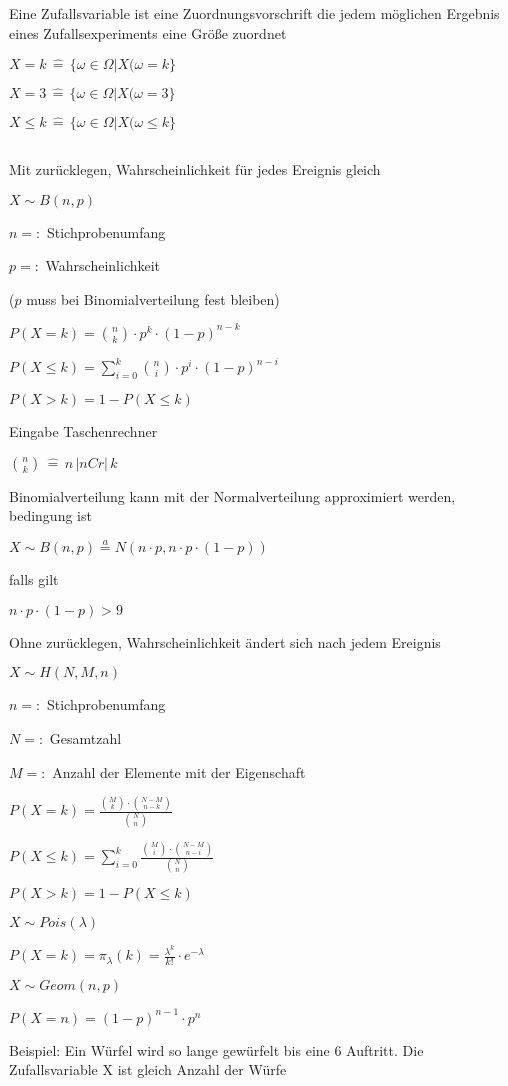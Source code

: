 \documentclass[10pt,a4paper,landscape]{article}
\begin{document}
\begin{multicols*}{4}
\subsection{}
\parbox{\columnwidth}{\centering Eine Zufallsvariable ist eine Zuordnungsvorschrift die jedem  möglichen Ergebnis eines Zufallsexperiments eine Größe zuordnet}
\parbox{\columnwidth}{\centering $X = k \, \widehat{=} \, \{ \omega \in \Omega \vert X( \omega = k \}$}
\parbox{\columnwidth}{\centering $X = 3 \, \widehat{=} \, \{ \omega \in \Omega \vert X( \omega = 3 \}$}
\parbox{\columnwidth}{\centering $X \leq k \, \widehat{=} \, \{ \omega \in \Omega \vert X( \omega \leq k \}$}
\subsection{}
\parbox{\columnwidth}{\centering Mit zurücklegen, Wahrscheinlichkeit für jedes Ereignis gleich }
\parbox{\columnwidth}{\centering $X \sim B(n,p)$}
\parbox{\columnwidth}{\centering $n =:$ Stichprobenumfang}
\parbox{\columnwidth}{\centering $p =:$ Wahrscheinlichkeit}
\parbox{\columnwidth}{\centering ($p$ muss bei Binomialverteilung fest bleiben)}
\parbox{\columnwidth}{\centering $P(X=k) = \binom{n}{k} \cdot p^k \cdot (1-p)^{n-k}$}
\parbox{\columnwidth}{\centering $P(X \leq k) = \sum \limits_{i=0}^k\binom{n}{i} \cdot p^i \cdot (1-p)^{n-i}$}
\parbox{\columnwidth}{\centering $P(X > k) = 1 - P(X \leq k)$}
\parbox{\columnwidth}{\centering Eingabe Taschenrechner}
\parbox{\columnwidth}{\centering $\binom{n}{k} \, \widehat{=} \, n \, \vert nCr \vert \, k$}
\parbox{\columnwidth}{\centering Binomialverteilung kann mit der Normalverteilung approximiert werden, bedingung ist}
\parbox{\columnwidth}{\centering $X \sim B(n, p) \stackrel{a}{=} N(n \cdot p, n \cdot p \cdot (1-p))$}
\parbox{\columnwidth}{\centering falls gilt}
\parbox{\columnwidth}{\centering $n \cdot p \cdot (1-p) > 9$}
\parbox{\columnwidth}{\centering Ohne zurücklegen, Wahrscheinlichkeit ändert sich nach jedem Ereignis}
\parbox{\columnwidth}{\centering $X \sim H(N, M, n)$}
\parbox{\columnwidth}{\centering $n =:$ Stichprobenumfang}
\parbox{\columnwidth}{\centering $N =:$ Gesamtzahl}
\parbox{\columnwidth}{\centering $M =:$ Anzahl der Elemente mit der Eigenschaft}
\parbox{\columnwidth}{\centering $P(X = k) = \frac{\binom{M}{k} \cdot \binom{N-M}{n-k}}{\binom{N}{n}} $}
\parbox{\columnwidth}{\centering $P(X \leq k) = \sum \limits_{i=0}^k \frac{\binom{M}{i} \cdot \binom{N-M}{n-i}}{\binom{N}{n}} $}
\parbox{\columnwidth}{\centering $P(X > k) = 1 - P(X \leq k)$}
\parbox{\columnwidth}{\centering $X \sim Pois(\lambda)$}
\parbox{\columnwidth}{\centering $P(X = k) = \pi_\lambda(k) = \frac{\lambda^k}{k!} \cdot e^{-\lambda}$}
\parbox{\columnwidth}{\centering $X \sim Geom(n, p)$}
\parbox{\columnwidth}{\centering $P(X = n) = (1-p)^{n-1} \cdot p^n$}
\parbox{\columnwidth}{\centering Beispiel: Ein Würfel wird so lange gewürfelt bis eine 6 Auftritt. Die Zufallsvariable X ist gleich Anzahl der Würfe}

\end{multicols*}
\end{document}
